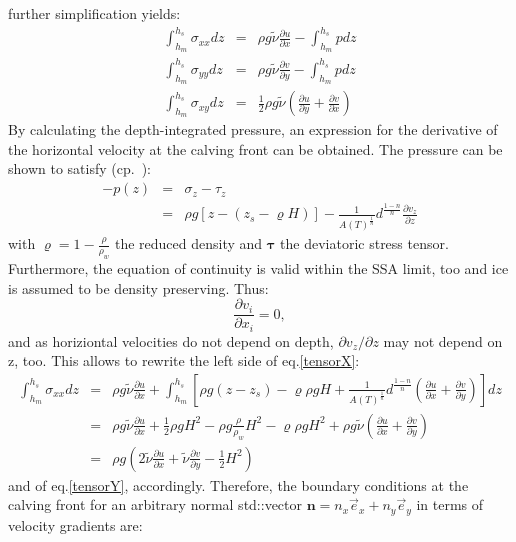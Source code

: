 \documentclass[a4paper,10pt]{article}
\begin{document}
further simplification yields:
\begin{eqnarray}%
\int_{h_m}^{h_s}\sigma_{xx}dz & = &
\rho g\tilde{\nu} \frac{\partial u}{\partial x} - \int_{h_m}^{h_s}p dz \label{tensorX}\\
\int_{h_m}^{h_s}\sigma_{yy}dz & = &
\rho g\tilde{\nu} \frac{\partial v}{\partial y} - \int_{h_m}^{h_s}p dz \label{tensorY}\\
\int_{h_m}^{h_s}\sigma_{xy}dz & = &
\frac{1}{2} \rho g\tilde{\nu} \left(\frac{\partial u}{\partial y}+\frac{\partial v}{\partial x} \right) \label{tensorXY}
\end{eqnarray}
By calculating the depth-integrated pressure, an expression for the derivative of the horizontal velocity at the calving front can be obtained. The pressure can be shown to satisfy (cp.~\cite{Weis01}):
\begin{eqnarray*}
-p(z) & = & \sigma_z - \tau_z \\
      & = & \rho g\left[z-\left(z_s-\varrho H\right)\right] -\frac{1}{A(T)^\frac{1}{n}}d^\frac{1-n}{n}\frac{\partial v_z}{\partial z}
\end{eqnarray*}
with $\varrho=1-\frac{\rho}{\rho_w}$ the reduced density and $\mathbf{\tau}$ the deviatoric stress tensor.  Furthermore, the equation of continuity is valid within the SSA limit, too and ice is assumed to be density preserving. Thus:
\begin{equation*}
\frac{\partial v_i}{\partial x_i} = 0,
\end{equation*}
and as horiziontal velocities do not depend on depth, $\partial v_z/ \partial
z$ may not depend on z, too. This allows to rewrite the left side of eq.\eqref{tensorX}:
\begin{eqnarray*}
\int_{h_m}^{h_s}\sigma_{xx}dz & = & \rho g\tilde{\nu} \frac{\partial u}{\partial x} + \int_{h_m}^{h_s} \left[ \rho g(z-z_s) - \varrho\rho gH+\frac{1}{A(T)^\frac{1}{n}}d^\frac{1-n}{n} \left( \frac{\partial u}{\partial x}+\frac{\partial v}{\partial y} \right) \right] dz \\
& = & \rho g\tilde{\nu} \frac{\partial u}{\partial x} +  \frac{1}{2}\rho gH^2 - \rho g \frac{\rho}{\rho_w}H^2 -\varrho\rho gH^2+\rho g \tilde{\nu}\left( \frac{\partial u}{\partial x} + \frac{\partial v}{\partial y} \right) \\
& = & \rho g \left(2\tilde{\nu}\frac{\partial u}{\partial x} + \tilde{\nu}\frac{\partial v}{\partial y} - \frac{1}{2}H^2   \right) 
\end{eqnarray*}
and of eq.\eqref{tensorY}, accordingly. Therefore, the boundary conditions at the calving front for an arbitrary normal std::vector $\mathbf{n}=n_x\overrightarrow{e}_x+n_y\overrightarrow{e}_y$ in terms of velocity gradients are: 
\end{document}

